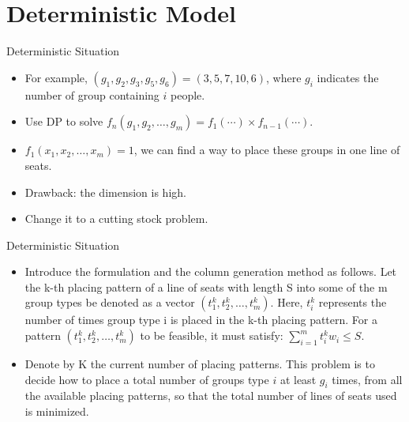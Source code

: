 
\section{Deterministic Model}

    \frame{\sectionpage}

    \begin{frame}{Deterministic Situation}
      \begin{itemize}
        \item For example, $(g_1, g_2, g_3, g_5, g_6) =(3,5,7,10,6)$, where $g_i$ indicates the number of group containing $i$ people.
        \item Use DP to solve $f_n(g_1, g_2, \ldots, g_m) = f_1(\cdots)\times f_{n-1}(\cdots)$.
        \item $f_1(x_1,x_2,\ldots,x_m) =1$, we can find a way to place these groups in one line of seats.
        \item Drawback: the dimension is high.
        \item Change it to a cutting stock problem.
      \end{itemize}
    \end{frame}

    \begin{frame}{Deterministic Situation}
      \begin{itemize}
        \item Introduce the formulation and the column generation method as follows. Let the k-th placing pattern of a line of seats with length S into some of the m group types be denoted as a vector $(t^k_1,t^k_2,\ldots,t^k_m)$. Here, $t^k_i$ represents the number of times group type i is placed in the k-th placing pattern. For a pattern $(t^k_1,t^k_2,\ldots,t^k_m)$ to be feasible, it must satisfy:
        $\sum_{i=1}^m t^k_i w_i \leq S$.
        \item Denote by K the current number of placing patterns. This problem is to decide how to place a total number of groups type $i$ at least $g_i$ times, from all the available placing patterns, so that the total number of lines of seats used is minimized.
      \end{itemize}
    \end{frame}

